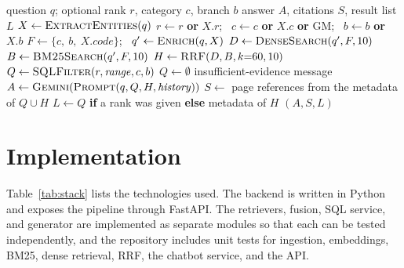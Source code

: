 \documentclass[conference]{IEEEtran}
\begin{document}
\begin{algorithm}[!t]
\caption{Hybrid Query Processing}
\label{alg:pipeline}
\footnotesize
\begin{algorithmic}[1]
\Require question $q$; optional rank $r$, category $c$, branch $b$
\Ensure answer $A$, citations $S$, result list $L$
\State $X \gets \textsc{ExtractEntities}(q)$
\State $r \gets r$ \textbf{or} $X.r$; \ $c \gets c$ \textbf{or} $X.c$ \textbf{or} GM; \ $b \gets b$ \textbf{or} $X.b$
\State $F \gets \{c,\ b,\ X.\mathit{code}\}$; \ $q' \gets \textsc{Enrich}(q, X)$
\State $D \gets \textsc{DenseSearch}(q', F, 10)$
\State $B \gets \textsc{BM25Search}(q', F, 10)$
\State $H \gets \textsc{RRF}(D, B, k{=}60, 10)$
    \State $Q \gets \textsc{SQLFilter}(r, \mathit{range}, c, b)$
\Else
    \State $Q \gets \emptyset$
\EndIf
{}
    \State \Return insufficient-evidence message
\EndIf
\State $A \gets \textsc{Gemini}(\textsc{Prompt}(q, Q, H, \mathit{history}))$
\State $S \gets$ page references from the metadata of $Q \cup H$
\State $L \gets Q$ \textbf{if} a rank was given \textbf{else} metadata of $H$
\State \Return $(A, S, L)$
\end{algorithmic}
\end{algorithm}

\section{Implementation}

Table~\ref{tab:stack} lists the technologies used. The backend is
written in Python and exposes the pipeline through FastAPI. The
retrievers, fusion, SQL service, and generator are implemented as
separate modules so that each can be tested independently, and the
repository includes unit tests for ingestion, embeddings, BM25,
dense retrieval, RRF, the chatbot service, and the API.
\end{document}
